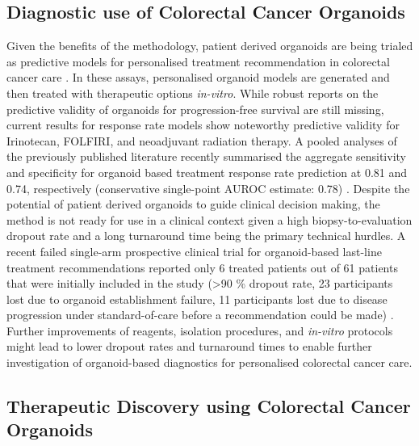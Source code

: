 \begin{flushleft}
\subsection{Diagnostic use of Colorectal Cancer Organoids}

Given the benefits of the methodology, patient derived organoids are being trialed as predictive models for personalised treatment recommendation in colorectal cancer care \citep{vandeweteringProspectiveDerivationLiving2015, vlachogiannisPatientderivedOrganoidsModel2018, ganeshRectalCancerOrganoid2019, ooftPatientderivedOrganoidsCan2019, yaoPatientDerivedOrganoidsPredict2020a}. In these assays, personalised organoid models are generated and then treated with therapeutic options \textit{in-vitro}. While robust reports on the predictive validity of organoids for progression-free survival are still missing, current results for response rate models show noteworthy predictive validity for Irinotecan, FOLFIRI, and neoadjuvant radiation therapy. A pooled analyses of the previously published literature recently summarised the aggregate sensitivity and specificity for organoid based treatment response rate prediction at 0.81 and 0.74, respectively (conservative single-point AUROC estimate: 0.78) \citep{wensinkPatientderivedOrganoidsPredictive2021, zhangNoteROCAnalysis2005}. Despite the potential of patient derived organoids to guide clinical decision making, the method is not ready for use in a clinical context given a high biopsy-to-evaluation dropout rate and a long turnaround time being the primary technical hurdles. A recent failed single-arm prospective clinical trial for organoid-based last-line treatment recommendations reported only 6 treated patients out of 61 patients that were initially included in the study (>90 \% dropout rate, 23 participants lost due to organoid establishment failure, 11 participants lost due to disease progression under standard-of-care before a recommendation could be made) \citep{ooftProspectiveExperimentalTreatment2021}. Further improvements of reagents, isolation procedures, and \textit{in-vitro} protocols might lead to lower dropout rates and turnaround times to enable further investigation of organoid-based diagnostics for personalised colorectal cancer care. \par

\subsection{Therapeutic Discovery using Colorectal Cancer Organoids} 


\end{flushleft}
